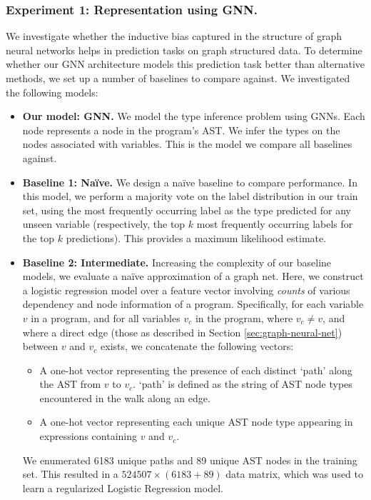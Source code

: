 \subsubsection{Experiment 1: Representation using GNN.}
We investigate whether the inductive bias captured in the structure of graph neural networks helps in prediction tasks on graph structured data.
To determine whether our GNN architecture models this prediction task better than alternative methods, we set up a number of baselines to compare against.
We investigated the following models:
\begin{itemize}[noitemsep,topsep=0pt]
\item \textbf{Our model: GNN.}
  We model the type inference problem using GNNs.
  Each node represents a node in the program's AST.
  We infer the types on the nodes associated with variables.
  This is the model we compare all baselines against.
\item \textbf{Baseline 1: Na\"ive.}
  We design a na\"ive baseline to compare performance.
  In this model, we perform a majority vote on the label distribution in our train set, using the most frequently occurring label as the type predicted for any unseen variable (respectively, the top $k$ most frequently occurring labels for the top $k$ predictions).
  This provides a maximum likelihood estimate.
\item \textbf{Baseline 2: Intermediate.}
  Increasing the complexity of our baseline models, we evaluate a na\"ive approximation of a graph net.
  Here, we construct a logistic regression model over a feature vector involving \textit{counts} of various dependency and node information of a program.
  Specifically, for each variable $v$ in a program, and for all variables $v_c$ in the program, where $v_c \neq v$, and where a direct edge (those as described in Section \ref{sec:graph-neural-net}) between $v$ and $v_c$ exists, we concatenate the following vectors:
  \begin{itemize}[noitemsep,topsep=0pt]
  \item A one-hot vector representing the presence of each distinct `path' along the AST from $v$ to $v_c$. `path' is defined as the string of AST node types encountered in the walk along an edge.
  \item A one-hot vector representing each unique AST node type appearing in expressions containing $v$ and $v_c$.
  \end{itemize}
  We enumerated 6183 unique paths and 89 unique AST nodes in the training set.
  This resulted in a $524507 \times (6183+89)$ data matrix, which was used to learn a regularized Logistic Regression model.

\end{itemize}
